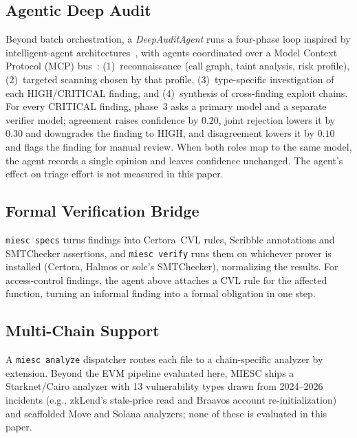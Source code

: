 \documentclass[conference]{IEEEtran}
\begin{document}
\subsection{Agentic Deep Audit}
\label{sec:deepaudit}

Beyond batch orchestration, a \emph{DeepAuditAgent} runs a four-phase loop inspired by intelligent-agent architectures~\cite{wooldridge1995intelligent}, with agents coordinated over a Model Context Protocol (MCP) bus~\cite{mcp2024}: (1)~reconnaissance (call graph, taint analysis, risk profile), (2)~targeted scanning chosen by that profile, (3)~type-specific investigation of each HIGH/CRITICAL finding, and (4)~synthesis of cross-finding exploit chains. For every CRITICAL finding, phase~3 asks a primary model and a separate verifier model; agreement raises confidence by $0.20$, joint rejection lowers it by $0.30$ and downgrades the finding to HIGH, and disagreement lowers it by $0.10$ and flags the finding for manual review. When both roles map to the same model, the agent records a single opinion and leaves confidence unchanged. The agent's effect on triage effort is not measured in this paper.

\subsection{Formal Verification Bridge}
\label{sec:formalbridge}

\texttt{miesc specs} turns findings into Certora~CVL rules, Scribble annotations and SMTChecker assertions, and \texttt{miesc verify} runs them on whichever prover is installed (Certora, Halmos or solc's SMTChecker), normalizing the results. For access-control findings, the agent above attaches a CVL rule for the affected function, turning an informal finding into a formal obligation in one step.

\subsection{Multi-Chain Support}

A \texttt{miesc analyze} dispatcher routes each file to a chain-specific analyzer by extension. Beyond the EVM pipeline evaluated here, MIESC ships a Starknet/Cairo analyzer with 13 vulnerability types drawn from 2024--2026 incidents (e.g., zkLend's stale-price read and Braavos account re-initialization) and scaffolded Move and Solana analyzers; none of these is evaluated in this paper.

\end{document}
